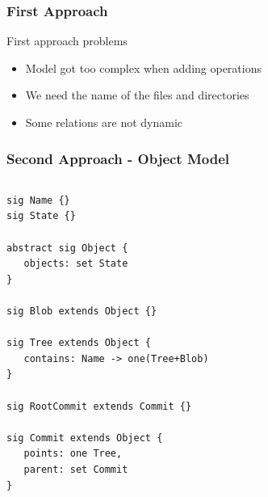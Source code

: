 \documentclass{beamer}
\begin{document}
\begin{frame}[fragile]
   \frametitle{First Approach}
   \begin{block}{First approach problems}
      \begin{itemize}
         \item Model got too complex when adding operations
         \item We need the name of the files and directories
         \item Some relations are not dynamic
      \end{itemize}
   \end{block}
\end{frame}


\begin{frame}[fragile]
   \frametitle{Second Approach - Object Model}
   \tiny
   \begin{columns}[c]
      \column{1.5in}
   \begin{lstlisting}
sig Name {}
sig State {}

abstract sig Object {
   objects: set State
}

sig Blob extends Object {}

sig Tree extends Object {
   contains: Name -> one(Tree+Blob)
}

sig RootCommit extends Commit {}

sig Commit extends Object {
   points: one Tree,
   parent: set Commit
}

\end{lstlisting}
   \column{1.5in}
   \end{columns}

\end{frame}
\end{document}
